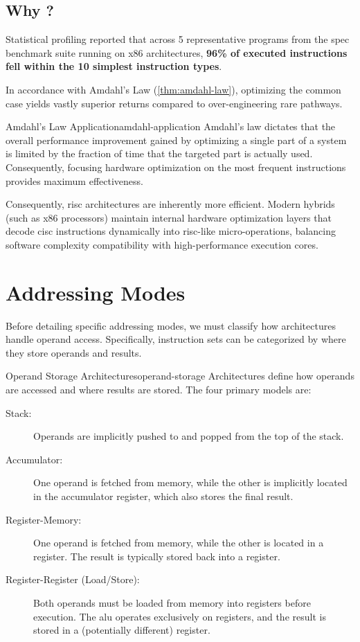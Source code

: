 \subsection{Why ?} 
Statistical profiling reported that across 5 representative programs from the \gls{spec} benchmark suite running on x86 architectures, \textbf{96\% of executed instructions fell within the 10 simplest instruction types}. 

In accordance with Amdahl's Law (\cref{thm:amdahl-law}), optimizing the common case yields vastly superior returns compared to over-engineering rare pathways. 

\begin{observation}{Amdahl's Law Application}{amdahl-application}
    Amdahl's law dictates that the overall performance improvement gained by optimizing a single part of a system is limited by the fraction of time that the targeted part is actually used. Consequently, focusing hardware optimization on the most frequent instructions provides maximum effectiveness.
\end{observation}

\noindent Consequently, \gls{risc} architectures are inherently more efficient. Modern hybrids (such as x86 processors) maintain internal hardware optimization layers that decode \gls{cisc} instructions dynamically into \gls{risc}-like micro-operations, balancing software complexity compatibility with high-performance execution cores.

\section{Addressing Modes}
Before detailing specific addressing modes, we must classify how architectures handle operand access. Specifically, instruction sets can be categorized by where they store operands and results.

\begin{concept}{Operand Storage Architectures}{operand-storage}
    Architectures define how operands are accessed and where results are stored. The four primary models are:
    \begin{description}
        \item[Stack:] Operands are implicitly pushed to and popped from the top of the stack.
        \item[Accumulator:] One operand is fetched from memory, while the other is implicitly located in the accumulator register, which also stores the final result.
        \item[Register-Memory:] One operand is fetched from memory, while the other is located in a register. The result is typically stored back into a register.
        \item[Register-Register (Load/Store):] Both operands must be loaded from memory into registers before execution. The \gls{alu} operates exclusively on registers, and the result is stored in a (potentially different) register.
    \end{description}
\end{concept}

